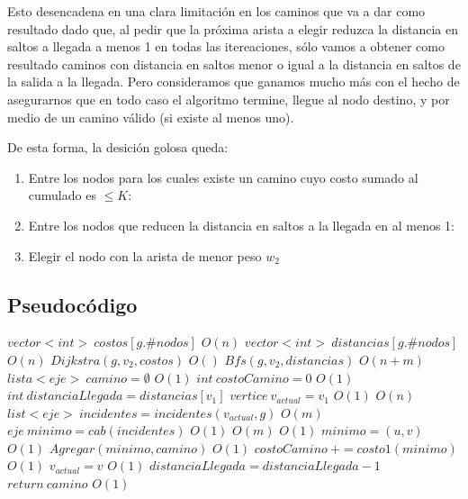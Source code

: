 \vspace{2mm}

Esto desencadena en una clara limitaci\'on en los caminos que va a dar como resultado dado que, al pedir que la pr\'oxima arista a elegir reduzca la distancia en saltos a llegada a menos 1 en todas las itereaciones, s\'olo vamos a obtener como resultado caminos con distancia en saltos menor o igual a la distancia en saltos de la salida a la llegada. Pero consideramos que ganamos mucho m\'as con el hecho de asegurarnos que en todo caso el algoritmo termine, llegue al nodo destino, y por medio de un camino v\'alido (si existe al menos uno).

De esta forma, la desici\'on golosa queda:

\begin{enumerate}
\item Entre los nodos para los cuales existe un camino cuyo costo sumado al cumulado es $\leq K$:
\item Entre los nodos que reducen la distancia en saltos a la llegada en al menos 1:
\item Elegir el nodo con la arista de menor peso $w_2$
\end{enumerate}

\subsection{Pseudoc\'odigo}


\begin{algorithmic}


\State $vector<int> \: costos[g.\#nodos]$
\Comment $ O(n) $
\State $vector<int> \: distancias[g.\#nodos]$
\Comment $ O(n) $
\State $ Dijkstra( g, v_2, costos) $
\Comment $ O() $
\State $ Bfs( g, v_2, distancias) $
\Comment $ O(n+m) $
\State $lista<eje> \: camino= \emptyset$
\Comment $ O(1) $
\State $ int \: costoCamino = 0 $
\Comment $ O(1) $
\State $ int \: distanciaLlegada = distancias[v_1]$
\State $ vertice \: v_{actual} = v_1 $
\Comment $ O(1) $
\Comment $ O(n) $
	\State $ list<eje> \: incidentes = incidentes(v_{actual}, g) $
	\Comment $ O(m) $
	\State $ eje \:	 minimo = cab(incidentes) $
	\Comment $ O(1)$
	\Comment $ O(m) $
		\Comment $ O(1) $
			\State $ minimo = (u,v) $
			\Comment $ O(1) $
		\EndIf
	\EndFor
	\State $ Agregar(minimo, camino) $
	\Comment $ O(1) $
	\State $ costoCamino \: += costo1(minimo) $
	\Comment $ O(1) $
	\State $ v_{actual} = v $
	\Comment $ O(1) $
	\State $distanciaLlegada = distanciaLlegada - 1 $
\EndWhile
\State $ return \: camino $
\Comment $ O(1) $

\EndProcedure

\end{algorithmic}

